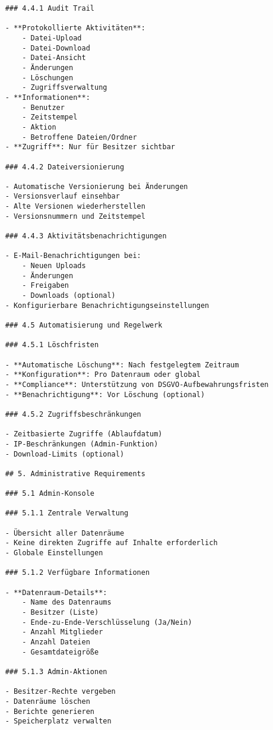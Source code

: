 \begin{verbatim}
    ### 4.4.1 Audit Trail
    
    - **Protokollierte Aktivitäten**:
        - Datei-Upload
        - Datei-Download
        - Datei-Ansicht
        - Änderungen
        - Löschungen
        - Zugriffsverwaltung
    - **Informationen**:
        - Benutzer
        - Zeitstempel
        - Aktion
        - Betroffene Dateien/Ordner
    - **Zugriff**: Nur für Besitzer sichtbar
    
    ### 4.4.2 Dateiversionierung
    
    - Automatische Versionierung bei Änderungen
    - Versionsverlauf einsehbar
    - Alte Versionen wiederherstellen
    - Versionsnummern und Zeitstempel
    
    ### 4.4.3 Aktivitätsbenachrichtigungen
    
    - E-Mail-Benachrichtigungen bei:
        - Neuen Uploads
        - Änderungen
        - Freigaben
        - Downloads (optional)
    - Konfigurierbare Benachrichtigungseinstellungen
    
    ### 4.5 Automatisierung und Regelwerk
    
    ### 4.5.1 Löschfristen
    
    - **Automatische Löschung**: Nach festgelegtem Zeitraum
    - **Konfiguration**: Pro Datenraum oder global
    - **Compliance**: Unterstützung von DSGVO-Aufbewahrungsfristen
    - **Benachrichtigung**: Vor Löschung (optional)
    
    ### 4.5.2 Zugriffsbeschränkungen
    
    - Zeitbasierte Zugriffe (Ablaufdatum)
    - IP-Beschränkungen (Admin-Funktion)
    - Download-Limits (optional)
    
    ## 5. Administrative Requirements
    
    ### 5.1 Admin-Konsole
    
    ### 5.1.1 Zentrale Verwaltung
    
    - Übersicht aller Datenräume
    - Keine direkten Zugriffe auf Inhalte erforderlich
    - Globale Einstellungen
    
    ### 5.1.2 Verfügbare Informationen
    
    - **Datenraum-Details**:
        - Name des Datenraums
        - Besitzer (Liste)
        - Ende-zu-Ende-Verschlüsselung (Ja/Nein)
        - Anzahl Mitglieder
        - Anzahl Dateien
        - Gesamtdateigröße
    
    ### 5.1.3 Admin-Aktionen
    
    - Besitzer-Rechte vergeben
    - Datenräume löschen
    - Berichte generieren
    - Speicherplatz verwalten
    

\end{verbatim}
